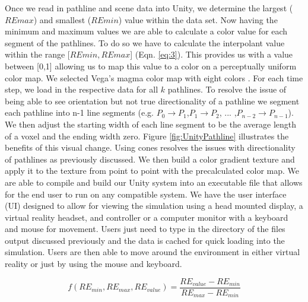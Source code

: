 Once we read in pathline and scene data into Unity, we determine the largest (\ensuremath{REmax}) and smallest (\ensuremath{REmin}) value within the data set. Now having the minimum and maximum values we are able to calculate a color value for each segment of the pathlines. To do so we have to calculate the interpolant value within the range [\ensuremath{REmin, REmax}] (Eqn. \ref{eq:3}). This provides us with a value between [0,1] allowing us to  map this value to a color on a perceptually uniform color map. We selected Vega’s magma color map with eight colors \cite{colorschemes}. For each time step, we load in the respective data for all \ensuremath{k} pathlines. To resolve the issue of being able to see orientation but not true directionality of a pathline we segment each pathline into n-1 line segments (e.g. \ensuremath{P_0\rightarrow P_1},\ensuremath{P_1 \rightarrow P_2}, ... ,\ensuremath{P_{n-2} \rightarrow P_{n-1}}).
We then adjust the starting width of each line segment to be the average length of a voxel and the ending width zero. Figure \ref{fig:UnityPathline} illustrates the benefits of this visual change. Using cones resolves the issues with directionality of pathlines as previously discussed. We then build a color gradient texture and apply it to the texture from point to point with the precalculated color map. We are able to compile and build our Unity system into an executable file that allows for the end user to run on any compatible system. We have the user interface (UI) designed to allow for viewing the simulation using a head mounted display, a virtual reality headset, and controller or a computer monitor with a keyboard and mouse for movement. Users just need to type in the directory of the  files output discussed previously and the data is cached for quick loading into the simulation. Users are then able to move around the environment in either virtual reality or just by using the mouse and keyboard. 


\begin{equation} \label{eq:3}
f(RE_{min},RE_{max},RE_{value}) = \frac{RE_{value}-RE_{min}}{RE_{max}-RE_{min}}
\end{equation} 

